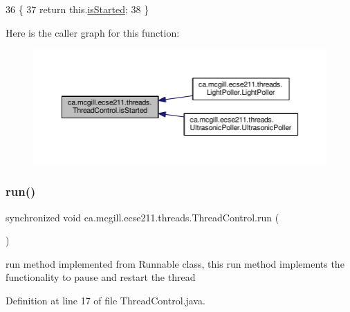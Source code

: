 \begin{DoxyCode}
36                                           \{
37     \textcolor{keywordflow}{return} this.\hyperlink{classca_1_1mcgill_1_1ecse211_1_1threads_1_1_thread_control_a92f4933511db42476e39956246bcf2fe}{isStarted};
38   \}
\end{DoxyCode}
Here is the caller graph for this function\+:\nopagebreak
\begin{figure}[H]
\begin{center}
\leavevmode
\includegraphics[width=350pt]{classca_1_1mcgill_1_1ecse211_1_1threads_1_1_thread_control_a92f4933511db42476e39956246bcf2fe_icgraph}
\end{center}
\end{figure}
\mbox{\label{classca_1_1mcgill_1_1ecse211_1_1threads_1_1_thread_control_a03e743000ea2c37080427565e8ec5f35}} 
\subsubsection{\texorpdfstring{run()}{run()}}
{\footnotesize\ttfamily synchronized void ca.\+mcgill.\+ecse211.\+threads.\+Thread\+Control.\+run (\begin{DoxyParamCaption}{ }\end{DoxyParamCaption})}

run method implemented from Runnable class, this run method implements the functionality to pause and restart the thread 

Definition at line 17 of file Thread\+Control.\+java.


